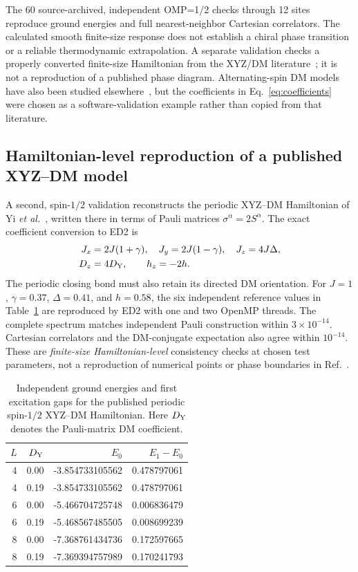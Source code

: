 \documentclass[preprint,12pt,nopreprintline]{elsarticle}
\begin{document}
The 60 source-archived, independent OMP=1/2 checks through
12 sites reproduce ground energies and full nearest-neighbor
Cartesian correlators. The calculated smooth finite-size response
does not establish a chiral phase transition or a reliable
thermodynamic extrapolation. A separate validation checks a
properly converted finite-size Hamiltonian from the XYZ/DM
literature~\cite{yi2019}; it is not a reproduction
of a published phase diagram. Alternating-spin DM
models have also been studied elsewhere~\cite{lahiri2022},
but the coefficients in Eq.~\eqref{eq:coefficients}
were chosen as a software-validation example
rather than copied from that literature.


\subsection{Hamiltonian-level reproduction of a published XYZ--DM model}
A second, spin-$1/2$ validation reconstructs the periodic
XYZ--DM Hamiltonian of Yi \emph{et al.}~\cite{yi2019},
written there in terms of Pauli matrices
$\sigma^\alpha=2S^\alpha$. The exact coefficient
conversion to ED2 is
\begin{equation}
\begin{split}
J_x&=2J(1+\gamma),\quad J_y=2J(1-\gamma),
\quad J_z=4J\Delta,\\
D_z&=4D_{\rm Y},\qquad h_z=-2h.
\end{split}
\label{eq:pauli-conversion}
\end{equation}
The periodic closing bond must also retain its directed
DM orientation. For $J=1$, $\gamma=0.37$,
$\Delta=0.41$, and $h=0.58$, the six independent
reference values in Table~\ref{tab:literature}
are reproduced by ED2 with one and two OpenMP threads.
The complete spectrum matches independent Pauli
construction within $3\times10^{-14}$.
Cartesian correlators and the DM-conjugate expectation
also agree within $10^{-14}$. These are
\emph{finite-size Hamiltonian-level} consistency
checks at chosen test parameters, not a reproduction
of numerical points or phase boundaries in Ref.~\cite{yi2019}.

\begin{table}[t]
\centering
\caption{Independent ground energies and first excitation gaps
for the published periodic spin-$1/2$ XYZ--DM Hamiltonian.
Here $D_{\rm Y}$ denotes the Pauli-matrix DM coefficient.}
\label{tab:literature}
\small
\begin{tabular}{rrrr}
\toprule
$L$ & $D_{\rm Y}$ & $E_0$ & $E_1-E_0$\\
\midrule
4 & 0.00 & -3.854733105562 & 0.478797061\\
4 & 0.19 & -3.854733105562 & 0.478797061\\
6 & 0.00 & -5.466704725748 & 0.006836479\\
6 & 0.19 & -5.468567485505 & 0.008699239\\
8 & 0.00 & -7.368761434736 & 0.172597665\\
8 & 0.19 & -7.369394757989 & 0.170241793\\
\bottomrule
\end{tabular}
\end{table}
\end{document}
